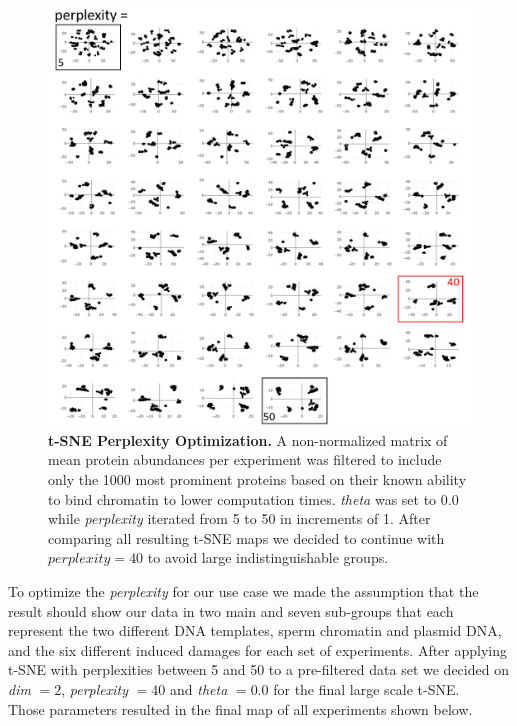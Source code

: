 \begin{figure}[H]
    \centering
    \includegraphics[width=\textwidth]{resources/images/Results/tSNE_opti.png}
    \caption[t-SNE Perplexity Optimization]{\textbf{t-SNE Perplexity Optimization. } A non-normalized matrix of mean protein abundances per experiment was filtered to include only the 1000 most prominent proteins based on their known ability to bind chromatin to lower computation times. \textit{theta} was set to 0.0 while \textit{perplexity} iterated from 5 to 50 in increments of 1. After comparing all resulting t-SNE maps we decided to continue with $perplexity = 40$ to avoid large indistinguishable groups.}
    \label{fig:tsneopti}
\end{figure}
To optimize the \textit{perplexity} for our use case we made the assumption that the result should show our data in two main and seven sub-groups that each represent the two different DNA templates, sperm chromatin and plasmid DNA, and the six different induced damages for each set of experiments. After applying t-SNE with perplexities between 5 and 50 to a pre-filtered data set we decided on \textit{dim} $= 2$, \textit{perplexity} $= 40$ and \textit{theta} $= 0.0$ for the final large scale t-SNE.\\
Those parameters resulted in the final map of all experiments shown below.
